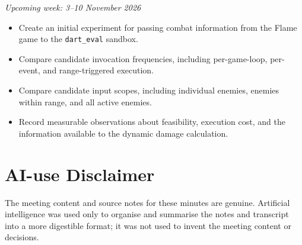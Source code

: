 \documentclass[12pt,a4paper]{article}
\begin{document}
\noindent\textit{Upcoming week: 3--10 November 2026}
\begin{itemize}[leftmargin=*]
    \item Create an initial experiment for passing combat information from the
    Flame game to the \texttt{dart\_eval} sandbox.
    \item Compare candidate invocation frequencies, including per-game-loop,
    per-event, and range-triggered execution.
    \item Compare candidate input scopes, including individual enemies,
    enemies within range, and all active enemies.
    \item Record measurable observations about feasibility, execution cost,
    and the information available to the dynamic damage calculation.
\end{itemize}

\section*{\small AI-use Disclaimer}
\small The meeting content and source notes for these minutes are genuine.
Artificial intelligence was used only to organise and summarise the notes
and transcript into a more digestible format; it was not used to invent the
meeting content or decisions.
\end{document}
